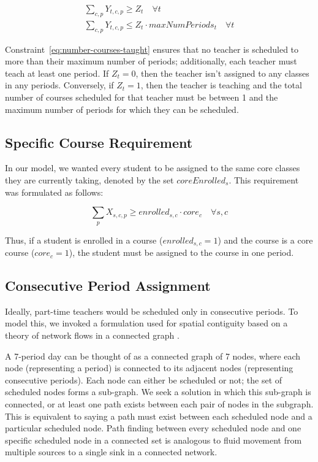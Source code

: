 \documentclass[12pt]{article}
\begin{document}
\begin{equation} \label{eq:number-courses-taught}
\begin{split}
	\displaystyle \sum_{c,p} Y_{t,c,p} \geq Z_{t} \quad \forall t \\
	\displaystyle \sum_{c,p} Y_{t,c,p} \leq Z_{t} \cdot maxNumPeriods_{t} \quad \forall t
\end{split}
\end{equation}

Constraint~\ref{eq:number-courses-taught} ensures that no teacher is scheduled to more than their maximum number of periods; additionally, each teacher must teach at least one period. If $Z_{t} = 0$, then the teacher isn't assigned to any classes in any periods. Conversely, if $Z_{t} = 1$, then the teacher is teaching and the total number of courses scheduled for that teacher must be between 1 and the maximum number of periods for which they can be scheduled.


\subsection{Specific Course Requirement}

In our model, we wanted every student to be assigned to the same core classes they are currently taking, denoted by the set $coreEnrolled_{s}$. This requirement was formulated as follows:

\begin{equation} \label{eq:required-core}
	\displaystyle \sum_{p} X_{s,c,p} \geq enrolled_{s,c} \cdot core_{c} \quad \forall s,c
\end{equation}

Thus, if a student is enrolled in a course ($enrolled_{s,c} = 1$) and the course is a core course ($core_{c}= 1$), the student must be assigned to the course in one period.

\subsection{Consecutive Period Assignment}

Ideally, part-time teachers would be scheduled only in consecutive periods. To model this, we invoked a formulation used for spatial contiguity based on a theory of network flows in a connected graph \cite{shirabe}.

A 7-period day can be thought of as a connected graph of 7 nodes, where each node (representing a period) is connected to its adjacent nodes (representing consecutive periods). Each node can either be scheduled or not; the set of scheduled nodes forms a sub-graph. We seek a solution in which this sub-graph is connected, or at least one path exists between each pair of nodes in the subgraph. This is equivalent to saying a path must exist between each scheduled node and a particular scheduled node. Path finding between every scheduled node and one specific scheduled node in a connected set is analogous to fluid movement from multiple sources to a single sink in a connected network.
\end{document}
